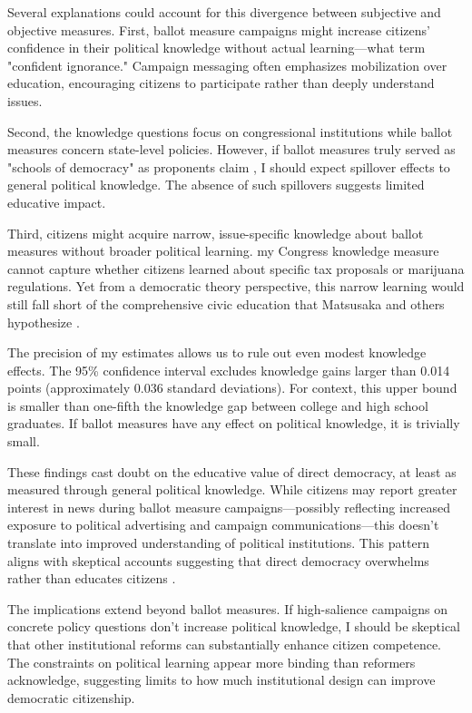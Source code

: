 \documentclass[12pt,letterpaper,oneside]{book}
\begin{document}
Several explanations could account for this divergence between subjective and objective measures. First, ballot measure campaigns might increase citizens' confidence in their political knowledge without actual learning—what \citet{kuklinski2000misinformation} term "confident ignorance." Campaign messaging often emphasizes mobilization over education, encouraging citizens to participate rather than deeply understand issues.

Second, the knowledge questions focus on congressional institutions while ballot measures concern state-level policies. However, if ballot measures truly served as "schools of democracy" as proponents claim \citep{tolbert2003virtual}, I should expect spillover effects to general political knowledge. The absence of such spillovers suggests limited educative impact.

Third, citizens might acquire narrow, issue-specific knowledge about ballot measures without broader political learning. my Congress knowledge measure cannot capture whether citizens learned about specific tax proposals or marijuana regulations. Yet from a democratic theory perspective, this narrow learning would still fall short of the comprehensive civic education that Matsusaka and others hypothesize \citep{matsusaka2020let}.

The precision of my estimates allows us to rule out even modest knowledge effects. The 95\% confidence interval excludes knowledge gains larger than 0.014 points (approximately 0.036 standard deviations). For context, this upper bound is smaller than one-fifth the knowledge gap between college and high school graduates. If ballot measures have any effect on political knowledge, it is trivially small.

These findings cast doubt on the educative value of direct democracy, at least as measured through general political knowledge. While citizens may report greater interest in news during ballot measure campaigns—possibly reflecting increased exposure to political advertising and campaign communications—this doesn't translate into improved understanding of political institutions. This pattern aligns with skeptical accounts suggesting that direct democracy overwhelms rather than educates citizens \citep{schumpeter1942capitalism, dyck2009grasping}.

The implications extend beyond ballot measures. If high-salience campaigns on concrete policy questions don't increase political knowledge, I should be skeptical that other institutional reforms can substantially enhance citizen competence. The constraints on political learning appear more binding than reformers acknowledge, suggesting limits to how much institutional design can improve democratic citizenship.
\end{document}
